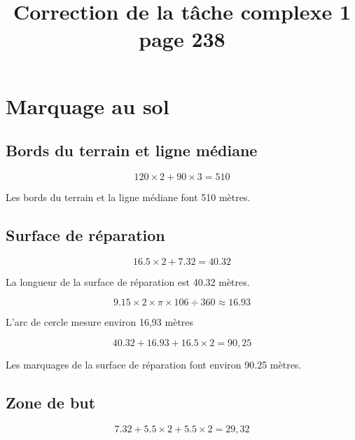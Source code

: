 \documentclass[12pt,a4paper]{article}
\title{Correction de la tâche complexe 1 page 238}
\date{}
\begin{document}
	
\maketitle


\section{Marquage au sol}


\subsection*{Bords du terrain et ligne médiane}

\begin{equation*}
	120 \times 2 + 90 \times 3 = 510
\end{equation*}

Les bords du terrain et la ligne médiane font 510 mètres.


\subsection*{Surface de réparation}

\begin{equation*}
	\num{16.5} \times 2 + 7.32 = \num{40.32}
\end{equation*}

La longueur de la surface de réparation est \num{40.32} mètres.

\begin{equation*}
	\num{9.15} \times 2 \times \pi \times 106 \div 360 \approx \num{16.93}
\end{equation*}

L'arc de cercle mesure environ 16,93 mètres

\begin{equation*}
	\num{40.32} + \num{16.93} + 16.5\times 2 = 90,25	
\end{equation*}

Les marquages de la surface de réparation font environ \num{90,25} mètres.

\subsection*{Zone de but}

\begin{equation*}
\num{7.32} + \num{5.5} \times 2 + \num{5.5} \times 2= 29,32	
\end{equation*}
\end{document}
